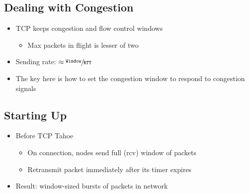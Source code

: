 \subsection{Dealing with Congestion}
\begin{itemize}[nosep]
    \item TCP keeps congestion and flow control windows
          \begin{itemize}[nosep]
              \item Max packets in flight is lesser of two
          \end{itemize}
    \item Sending rate: $\approx\sfrac{\texttt{Window}}{\texttt{RTT}}$
    \item The key here is how to set the congestion window to respond to congestion signals
\end{itemize}

\subsection{Starting Up}
\begin{itemize}[nosep]
    \item Before TCP Tahoe
          \begin{itemize}[nosep]
              \item On connection, nodes send full (rcv) window of packets
              \item Retransmit packet immediately after its timer expires
          \end{itemize}
    \item Result: window-sized bursts of packets in network
\end{itemize}

